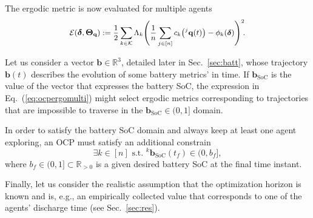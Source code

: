 \documentclass[letterpaper,10pt,conference,twoside]{IEEEtran}
\theoremstyle{definition}
\begin{document}
The ergodic metric is now evaluated for multiple agents\vspace*{-.1cm}
\begin{equation}\label{eq:multiergometric}
  \mathcal{E}(\boldsymbol{\delta},\boldsymbol{\Theta}_{\mathbf{q}}):={\small
  \frac{1}{2}
  \sum_{k\in\mathcal{K}}\Lambda_k 
    \Bigg(
      \frac{1}{n}\sum_{j\in[n]} c_k\big({}^j\mathbf{q}(t)\big)-\phi_k(\boldsymbol{\delta})
    \Bigg)^2\hspace*{-.5ex}.}
\end{equation}
\vspace*{-.2cm}

Let us consider a vector $\mathbf{b}\in\mathbb{R}^3$, detailed later in Sec.~\ref{sec:batt}, whose trajectory $\mathbf{b}(t)$ describes the evolution of some battery metrics' in time. If $\mathbf{b}_{\text{SoC}}$ is the value of the vector that expresses the battery %
SoC, the expression in Eq.~(\ref{eq:ocpergomulti}) might select ergodic metrics corresponding to trajectories that are impossible to traverse in the $\mathbf{b}_{\text{SoC}}\in(0,1]$ domain.%

In order to satisfy the battery SoC domain and always keep at least one agent exploring, an OCP must satisfy an additional constrain
\begin{equation}\label{eq:ocpbattconst}
  \exists k\in[n]\text{ s.t. }{}^k\mathbf{b}_{\text{SoC}}(t_f)\in(0,b_f],
\end{equation}
where $b_f\in(0,1]\subset\mathbb{R}_{>0}$ is a given desired battery SoC at the final time instant.

Finally, let us consider the realistic assumption that the optimization horizon %
is known and is,
e.g., an empirically collected value that corresponds to one of the agents' discharge time (see Sec.~\ref{sec:res}).
\end{document}
